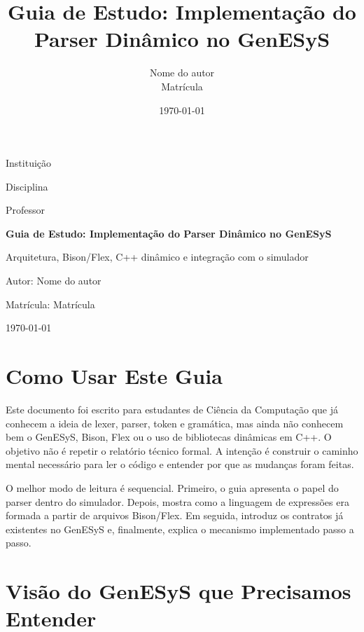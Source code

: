\documentclass[12pt,a4paper]{article}
\title{Guia de Estudo: Implementa\c{c}\~ao do Parser Din\^amico no GenESyS}
\author{Nome do autor \\ Matr\'icula}
\date{\today}
\begin{document}
\begin{titlepage}
    \thispagestyle{empty}
    \centering
    \vspace*{2cm}
    {\Large Institui\c{c}\~ao\par}
    \vspace{0.5cm}
    {\large Disciplina\par}
    \vspace{0.5cm}
    {\large Professor\par}
    \vfill
    {\bfseries\LARGE Guia de Estudo: Implementa\c{c}\~ao do Parser Din\^amico no GenESyS\par}
    \vspace{0.7cm}
    {\large Arquitetura, Bison/Flex, C++ din\^amico e integra\c{c}\~ao com o simulador\par}
    \vfill
    {\large Autor: Nome do autor\par}
    {\large Matr\'icula: Matr\'icula\par}
    \vspace{1.5cm}
    {\large \today\par}
\end{titlepage}

\tableofcontents
\newpage
{}

\section{Como Usar Este Guia}

Este documento foi escrito para estudantes de Ci\^encia da Computa\c{c}\~ao que j\'a conhecem a ideia de lexer, parser, token e gram\'atica, mas ainda n\~ao conhecem bem o GenESyS, Bison, Flex ou o uso de bibliotecas din\^amicas em C++. O objetivo n\~ao \'e repetir o relat\'orio t\'ecnico formal. A inten\c{c}\~ao \'e construir o caminho mental necess\'ario para ler o c\'odigo e entender por que as mudan\c{c}as foram feitas.

O melhor modo de leitura \'e sequencial. Primeiro, o guia apresenta o papel do parser dentro do simulador. Depois, mostra como a linguagem de express\~oes era formada a partir de arquivos Bison/Flex. Em seguida, introduz os contratos j\'a existentes no GenESyS e, finalmente, explica o mecanismo implementado passo a passo.

\section{Vis\~ao do GenESyS que Precisamos Entender}
\end{document}
